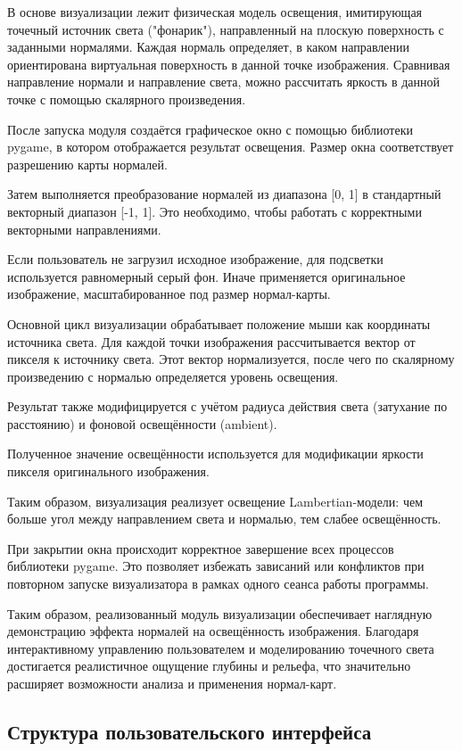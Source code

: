 В основе визуализации лежит физическая модель освещения, имитирующая точечный источник света ("фонарик"), направленный на плоскую поверхность с заданными нормалями. Каждая нормаль определяет, в каком направлении ориентирована виртуальная поверхность в данной точке изображения. Сравнивая направление нормали и направление света, можно рассчитать яркость в данной точке с помощью скалярного произведения.

После запуска модуля создаётся графическое окно с помощью библиотеки pygame, в котором отображается результат освещения. Размер окна соответствует разрешению карты нормалей.

Затем выполняется преобразование нормалей из диапазона [0, 1] в стандартный векторный диапазон [-1, 1]. Это необходимо, чтобы работать с корректными векторными направлениями.

Если пользователь не загрузил исходное изображение, для подсветки используется равномерный серый фон. Иначе применяется оригинальное изображение, масштабированное под размер нормал-карты.

Основной цикл визуализации обрабатывает положение мыши как координаты источника света. Для каждой точки изображения рассчитывается вектор от пикселя к источнику света. Этот вектор нормализуется, после чего по скалярному произведению с нормалью определяется уровень освещения.

Результат также модифицируется с учётом радиуса действия света (затухание по расстоянию) и фоновой освещённости (ambient). 

Полученное значение освещённости используется для модификации яркости пикселя оригинального изображения.

Таким образом, визуализация реализует освещение Lambertian-модели: чем больше угол между направлением света и нормалью, тем слабее освещённость.

При закрытии окна происходит корректное завершение всех процессов библиотеки pygame. Это позволяет избежать зависаний или конфликтов при повторном запуске визуализатора в рамках одного сеанса работы программы.

Таким образом, реализованный модуль визуализации обеспечивает наглядную демонстрацию эффекта нормалей на освещённость изображения. Благодаря интерактивному управлению пользователем и моделированию точечного света достигается реалистичное ощущение глубины и рельефа, что значительно расширяет возможности анализа и применения нормал-карт.
\subsection{Структура пользовательского интерфейса}


